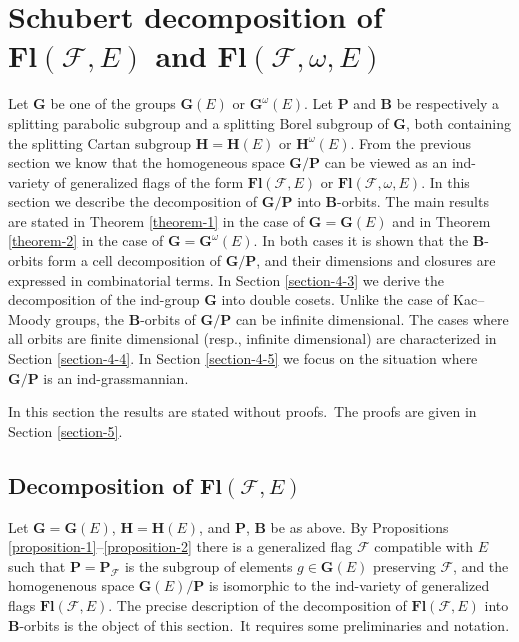 \documentclass[12pt]{amsart}
\theoremstyle{definition}
\begin{document}
\section{Schubert decomposition of $\mathbf{Fl}(\mathcal{F},E)$ and $\mathbf{Fl}(\mathcal{F},\omega,E)$}

\label{section-4}

Let $\mathbf{G}$ be one of the groups $\mathbf{G}(E)$ or $\mathbf{G}^\omega(E)$. Let $\mathbf{P}$ and $\mathbf{B}$ be respectively a splitting parabolic subgroup and a splitting Borel subgroup of $\mathbf{G}$, both containing the  splitting Cartan subgroup $\mathbf{H}=\mathbf{H}(E)$ or $\mathbf{H}^\omega(E)$.
From the previous section we know that the homogeneous space $\mathbf{G}/\mathbf{P}$ can be viewed as an ind-variety of generalized flags of the form $\mathbf{Fl}(\mathcal{F},E)$ or $\mathbf{Fl}(\mathcal{F},\omega,E)$.
In this section we describe the decomposition of $\mathbf{G}/\mathbf{P}$ into $\mathbf{B}$-orbits. The main results are stated in Theorem \ref{theorem-1} in the case of $\mathbf{G}=\mathbf{G}(E)$ and in Theorem \ref{theorem-2} in the case of $\mathbf{G}=\mathbf{G}^\omega(E)$. In both cases it is shown that the $\mathbf{B}$-orbits form a cell decomposition of $\mathbf{G}/\mathbf{P}$, and their dimensions and closures are expressed in combinatorial terms.
In Section \ref{section-4-3} we derive the decomposition of the ind-group $\mathbf{G}$ into double cosets.
Unlike the case of Kac--Moody groups, the $\mathbf{B}$-orbits of $\mathbf{G}/\mathbf{P}$ can be infinite dimensional. The cases where all orbits are finite dimensional (resp., infinite dimensional) are characterized in Section \ref{section-4-4}.
In Section \ref{section-4-5} we focus on the situation where $\mathbf{G}/\mathbf{P}$ is an ind-grassmannian.

In this section the results are stated without proofs.\ The proofs are given in Section \ref{section-5}.

\subsection{Decomposition of $\mathbf{Fl}(\mathcal{F},E)$}

\label{section-4-1}

Let $\mathbf{G}=\mathbf{G}(E)$, $\mathbf{H}=\mathbf{H}(E)$, and $\mathbf{P}$, $\mathbf{B}$ be as above.
By Propositions \ref{proposition-1}--\ref{proposition-2} there is a generalized flag $\mathcal{F}$ compatible with $E$ such that $\mathbf{P}=\mathbf{P}_\mathcal{F}$ is the subgroup of elements $g\in\mathbf{G}(E)$ preserving $\mathcal{F}$, and the homogenenous space $\mathbf{G}(E)/\mathbf{P}$ is isomorphic to the ind-variety of generalized flags $\mathbf{Fl}(\mathcal{F},E)$.
The precise description of the decomposition of $\mathbf{Fl}(\mathcal{F},E)$ into $\mathbf{B}$-orbits is the object of this section.\ It requires some preliminaries and notation.
\end{document}
